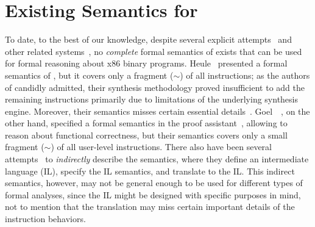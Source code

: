 \section{Existing Semantics for \ISA}

To date, to the best of our knowledge, despite several explicit attempts~\cite{Heule2016a,Goel:FMCAD14,Goel:ProCoS17} and other related systems~\cite{Leroy:2009,Remill,TSL:TOPLAS13,Hasabnis:ASPLOS16,Hasabnis:FSE16},
no \emph{complete} formal semantics of \ISA exists that can be used for formal reasoning about x86 binary programs.
%
Heule~\etal \cite{Heule2016a} presented a formal semantics of \ISA, but it covers only a fragment ($\sim$\strataPerc{}) of all instructions; as the authors of \cite{Heule2016a} candidly admitted, their synthesis methodology proved insufficient to add the remaining instructions primarily due to limitations of the underlying synthesis engine. 
%
Moreover, their semantics misses certain essential details~\cite{DasguptaAdve:PLDI19}.
%
%
Goel~\etal~\cite{Goel:FMCAD14,Goel:ProCoS17}, on the other hand, specified a formal semantics in the  proof assistant~\cite{ACL2:Kaufmann2000}, allowing to reason about functional correctness, but their semantics covers only a small fragment ($\sim$\goelPerc{}) of all user-level instructions.
%
There also have been several attempts~\cite{Angr1,BAP:CAV11,Radare2,Hasabnis:FSE16} to \emph{indirectly} describe the \ISA semantics, where they define an intermediate language (IL), specify the IL semantics, and translate \ISA to the IL.
This indirect semantics, however, may not be general enough to be used for different types of formal analyses, since the IL might be designed with specific purposes in mind, not to mention that the translation may miss certain important details of the instruction behaviors.
%
